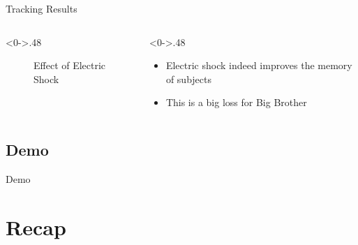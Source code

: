 \documentclass{beamer}
\begin{document}
\begin{frame}{Tracking Results}
  \begin{columns}[T] %
    \begin{column}<0->{.48\textwidth}
    \begin{figure}[thpb]
      \centering
      \caption{Effect of Electric Shock}
      \label{fig:stimulus}
    \end{figure}
    \end{column}
    \begin{column}<0->{.48\textwidth}
      \begin{itemize}
        \item Electric shock indeed improves the memory of subjects
        \item This is a big loss for Big Brother
      \end{itemize}
    \end{column}
  \end{columns}
\end{frame}
\subsection{Demo}
\begin{frame}{Demo}
\end{frame}
\section{Recap}
\end{document}
